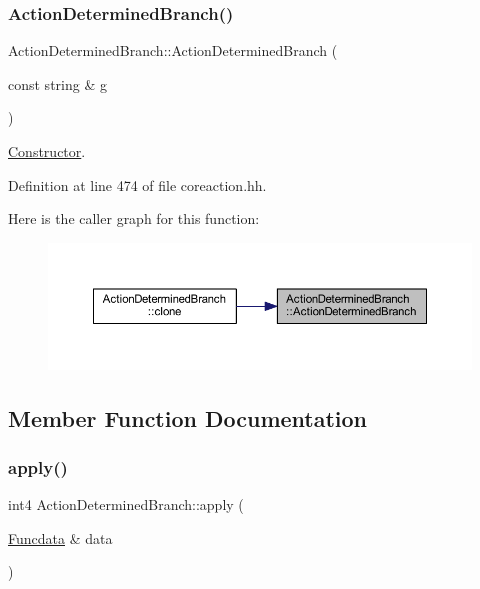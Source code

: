 \subsubsection{\texorpdfstring{ActionDeterminedBranch()}{ActionDeterminedBranch()}}
{\footnotesize\ttfamily Action\+Determined\+Branch\+::\+Action\+Determined\+Branch (\begin{DoxyParamCaption}\item[{const string \&}]{g }\end{DoxyParamCaption})\hspace{0.3cm}{\ttfamily [inline]}}



\mbox{\hyperlink{class_constructor}{Constructor}}. 



Definition at line 474 of file coreaction.\+hh.

Here is the caller graph for this function\+:
\nopagebreak
\begin{figure}[H]
\begin{center}
\leavevmode
\includegraphics[width=350pt]{class_action_determined_branch_a019f678e1dc3000e04810633d39b61f8_icgraph}
\end{center}
\end{figure}


\subsection{Member Function Documentation}
\mbox{\label{class_action_determined_branch_ade1a39edabc809aa136ef4f109d46560}} 
\subsubsection{\texorpdfstring{apply()}{apply()}}
{\footnotesize\ttfamily int4 Action\+Determined\+Branch\+::apply (\begin{DoxyParamCaption}\item[{\mbox{\hyperlink{class_funcdata}{Funcdata}} \&}]{data }\end{DoxyParamCaption})\hspace{0.3cm}{\ttfamily [virtual]}}



